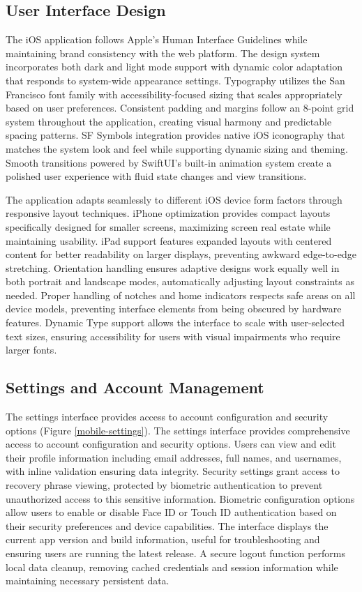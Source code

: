 \subsection{User Interface Design}
The iOS application follows Apple's Human Interface Guidelines while maintaining brand consistency with the web platform. The design system incorporates both dark and light mode support with dynamic color adaptation that responds to system-wide appearance settings. Typography utilizes the San Francisco font family with accessibility-focused sizing that scales appropriately based on user preferences. Consistent padding and margins follow an 8-point grid system throughout the application, creating visual harmony and predictable spacing patterns. SF Symbols integration provides native iOS iconography that matches the system look and feel while supporting dynamic sizing and theming. Smooth transitions powered by SwiftUI's built-in animation system create a polished user experience with fluid state changes and view transitions.

The application adapts seamlessly to different iOS device form factors through responsive layout techniques. iPhone optimization provides compact layouts specifically designed for smaller screens, maximizing screen real estate while maintaining usability. iPad support features expanded layouts with centered content for better readability on larger displays, preventing awkward edge-to-edge stretching. Orientation handling ensures adaptive designs work equally well in both portrait and landscape modes, automatically adjusting layout constraints as needed. Proper handling of notches and home indicators respects safe areas on all device models, preventing interface elements from being obscured by hardware features. Dynamic Type support allows the interface to scale with user-selected text sizes, ensuring accessibility for users with visual impairments who require larger fonts.

\subsection{Settings and Account Management}
The settings interface provides access to account configuration and security options (Figure \ref{mobile-settings}). The settings interface provides comprehensive access to account configuration and security options. Users can view and edit their profile information including email addresses, full names, and usernames, with inline validation ensuring data integrity. Security settings grant access to recovery phrase viewing, protected by biometric authentication to prevent unauthorized access to this sensitive information. Biometric configuration options allow users to enable or disable Face ID or Touch ID authentication based on their security preferences and device capabilities. The interface displays the current app version and build information, useful for troubleshooting and ensuring users are running the latest release. A secure logout function performs local data cleanup, removing cached credentials and session information while maintaining necessary persistent data.

